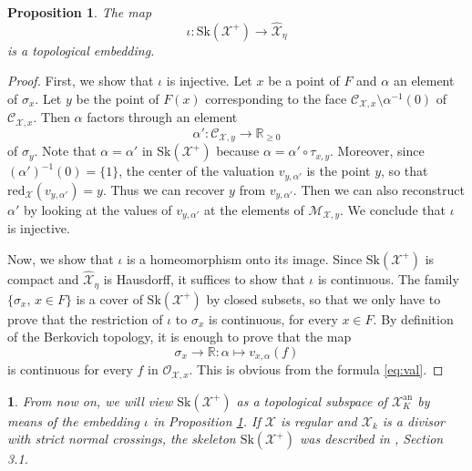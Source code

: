 \documentclass{amsart}%
\numberwithin{equation}{subsection}
\theoremstyle{plain2}
\newtheorem{prop}[equation]{Proposition}
\theoremstyle{definition2}
\theoremstyle{stepstyle}
\theoremstyle{point}
\theoremstyle{subpoint}
\newtheorem{subpoint}[equation]{}%
\newcommand{\spa}[1]{\begin{subpoint}#1\end{subpoint}}           %
\newcommand{\R}{\ensuremath{\mathbb{R}}}
\newcommand{\cX}{\ensuremath{\mathscr{X}}}
\renewcommand{\R}{\ensuremath{\mathbb{R}}}
\newcommand{\redu}{\mathrm{red}}
\newcommand{\an}{\mathrm{an}}
\newcommand{\Sk}{\mathrm{Sk}}
\begin{document}
\begin{prop}\label{prop-embed}
The map
$$\iota:\Sk(\cX^+)\to \widehat{\cX}_\eta$$  is a
topological embedding.
\end{prop}
\begin{proof}
First, we show that $\iota$ is injective. Let $x$ be a point of
$F$ and $\alpha$ an element of $\sigma_x$. Let $y$ be the point of
$F(x)$ corresponding to the face $\mathcal{C}_{\cX,x}\setminus
\alpha^{-1}(0)$ of $\mathcal{C}_{\cX,x}$. Then $\alpha$ factors
through an element
$$\alpha':\mathcal{C}_{\cX,y}\to \R_{\geq 0}$$ of $\sigma_y$.  Note that $\alpha=\alpha'$ in $\Sk(\cX^+)$ because
 $\alpha=\alpha'\circ \tau_{x,y}$.
 Moreover, since
$(\alpha')^{-1}(0)=\{1\}$, the center of the valuation
$v_{y,\alpha'}$ is the point $y$, so that
$\redu_{\cX}(v_{y,\alpha'})=y$. Thus we can recover $y$ from
$v_{y,\alpha'}$. Then we can also reconstruct $\alpha'$ by
 looking at the values of $v_{y,\alpha'}$ at the elements of
 $\mathcal{M}_{\cX,y}$. We conclude that $\iota$ is injective.

 Now, we show that $\iota$ is a homeomorphism onto its image. Since $\Sk(\cX^+)$ is compact and $\widehat{\cX}_\eta$ is Hausdorff,
it suffices to show that $\iota$ is continuous. The family
$\{\sigma_x,\,x\in F\}$ is a cover of $\Sk(\cX^+)$ by closed
subsets, so that we only have to prove that the restriction of
$\iota$ to $\sigma_x$ is continuous, for every $x\in F$. By
definition of the Berkovich topology, it is enough to prove that
the map
$$\sigma_x\to \R:\alpha\mapsto v_{x,\alpha}(f)$$ is continuous for
every $f$ in $\mathcal{O}_{\cX,x}$. This is obvious from the
formula \eqref{eq:val}.
\end{proof}

\spa{ From now on, we will view $\Sk(\cX^+)$ as a topological
subspace of $\cX_K^{\an}$ by means of the embedding $\iota$ in
Proposition \ref{prop-embed}. If $\cX$ is regular and $\cX_k$ is a
divisor with strict normal crossings, the skeleton $\Sk(\cX^+)$ was
described in \cite{MustataNicaise}, Section 3.1.}
\end{document}
